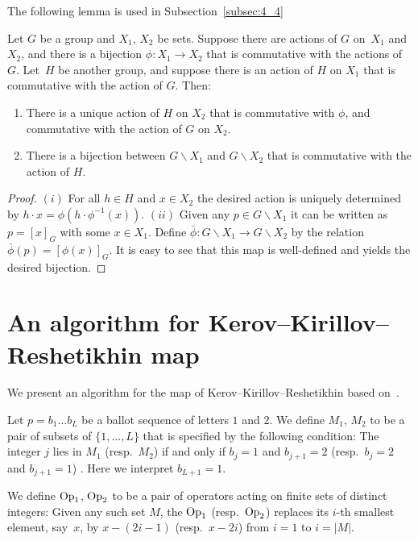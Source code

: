 \documentclass[pdftex]{sigma}
\begin{document}
The following lemma is used in Subsection~\ref{subsec:4_4}
\begin{lemma}\label{lem:apr8_1}
Let $G$ be a group and $X_1$, $X_2$ be sets.
Suppose there are actions of $G$ on~$X_1$ and~$X_2$, and there is a bijection $\phi : X_1 \rightarrow X_2$ that is
commutative with the actions of~$G$.
Let~$H$ be another group, and suppose there is an action of $H$ on $X_1$ that is commutative with the action of $G$.
Then:
\begin{enumerate}\itemsep=0pt
\item There is a unique action of $H$ on $X_2$ that is commutative with $\phi$, and commutative with
the action of $G$ on $X_2$.
\item There is a bijection between $G \backslash X_1$ and  $G \backslash X_2$ that is commutative with the action of $H$.
\end{enumerate}
\end{lemma}
\begin{proof}
$(i)$ For all $h \in H$ and $x \in X_2$
the desired action is uniquely determined by $h \cdot x = \phi (h \cdot \phi^{-1} (x))$.
$(ii)$
Given any $p \in G \backslash X_1$ it can be written as $p = [x]_G$ with some $x \in X_1$.
Def\/ine $\bar{\phi}: G \backslash X_1 \rightarrow G \backslash X_2$ by the relation $\bar{\phi} (p) = [\phi (x)]_G$.
It is easy to see that this map is well-def\/ined and yields the desired bijection.
\end{proof}

\section[An algorithm for Kerov-Kirillov-Reshetikhin map]{An algorithm for Kerov--Kirillov--Reshetikhin map}\label{app:B}

We present an algorithm for the map of Kerov--Kirillov--Reshetikhin
based on~\cite{Takagi}.

Let $p = b_1 \ldots b_L$ be a ballot sequence of letters $1$ and $2$.
We def\/ine $M_1$, $M_2$ to be a pair of subsets of $\{ 1, \ldots, L \}$ that is specif\/ied by
the following condition:
The integer $j$ lies in $M_1$ (resp.~$M_2$) if and only if $b_j = 1$ and $b_{j+1} = 2$
(resp.~$b_j = 2$ and $b_{j+1} = 1$) .
Here we interpret $b_{L+1}=1$.

We def\/ine ${\rm Op}_1$, ${\rm Op}_2$ to be a pair of operators acting
on f\/inite sets of distinct integers:
Given any such set $M$, the ${\rm Op}_1$ (resp.~${\rm Op}_2$) replaces its $i$-th smallest element, say~$x$, by
$x - (2i-1)$ (resp.~$x - 2i$) from $i=1$ to $i=|M|$.
\end{document}
